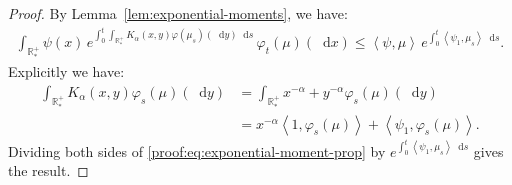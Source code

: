 \documentclass[11pt,a4paper]{article}
\newcommand{\RRP}{\mathbb{R}^+_*}
\newcommand{\brac}[1]{\left\langle#1\right\rangle}
\newcommand{\dd}{\mathop{}\!\mathrm{d}}
\begin{document}
\begin{proof}
    By Lemma~\ref{lem:exponential-moments}, we have:
    \begin{align}\label{proof:eq:exponential-moment-prop}
        \int_{\RRP} \psi(x)\, e^{\int_0^t \int_{\RRP} K_{\alpha}(x,y) \varphi(\mu_s)(\dd y)\dd s}\, \varphi_t(\mu)(\dd x) \leq \brac{\psi,\mu} \, e^{\int_0^t \brac{\psi_1,\mu_s} \dd s}.
    \end{align}
    Explicitly we have:
    \begin{align*}
        \int_{\RRP} K_{\alpha}(x,y) \varphi_s(\mu)(\dd y) 
        &= \int_{\RRP}x^{-\alpha} + y^{-\alpha} \varphi_s(\mu)(\dd y) \\
        &= x^{-\alpha} \brac{1,\varphi_s(\mu)} + \brac{\psi_1,\varphi_s(\mu)}.
    \end{align*}
    Dividing both sides of \eqref{proof:eq:exponential-moment-prop} by $e^{\int_0^t \brac{\psi_1,\mu_s} \dd s}$ gives the result.
\end{proof}
\end{document}
